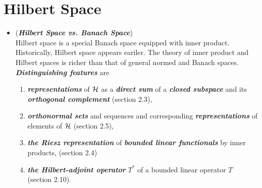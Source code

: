 \documentclass[11pt]{article}
\begin{document}
\section{Hilbert Space}
\begin{itemize}
\item \begin{remark} (\emph{\textbf{Hilbert Space vs. Banach Space}})\\
Hilbert space is a special Banach space equipped with inner product. Historically, Hilbert space appears eariler.  The theory of inner product and Hilbert spaces is richer than that of general normed and Banach spaces. \emph{\textbf{Distinguishing features}} are
\begin{enumerate}
\item  \textbf{\emph{representations}} of ${\mathcal H}$ as a \emph{\textbf{direct sum}} of a \emph{\textbf{closed subspace}} and its \emph{\textbf{orthogonal complement}} (section 2.3),
\item \emph{\textbf{orthonormal sets}} and sequences and corresponding \emph{\textbf{representations}} of elements of ${\mathcal H}$ (section 2.5),
\item \emph{\textbf{the Riesz representation}} of \emph{\textbf{bounded linear functionals}} by inner products, (section 2.4)
\item \emph{\textbf{the Hilbert-adjoint operator}} $T^{*}$ of a bounded linear operator $T$ (section 2.10).
\end{enumerate}
\end{remark}
\end{itemize}
\end{document}
